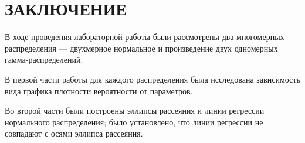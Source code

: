 \section*{ЗАКЛЮЧЕНИЕ}

В ходе проведения лабораторной работы были рассмотрены два многомерных
распределения --- двухмерное нормальное и произведение двух одномерных гамма-распределений.

В первой части работы для каждого распределения была исследована
зависимость вида графика плотности вероятности от параметров. 

Во второй части были построены эллипсы рассеяния и линии регрессии
нормального распределения; было установлено, что линии регрессии не
совпадают с осями эллипса рассеяния.

\newpage